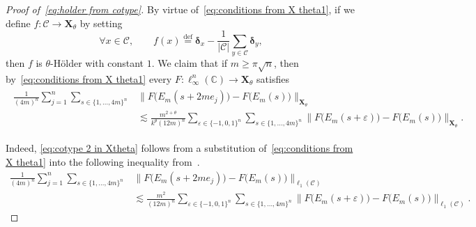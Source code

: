 \documentclass[11pt,reqno]{amsart}
\renewcommand{\ge}{\geqslant}
\renewcommand{\setminus}{\smallsetminus}
\newcommand{\bd}{\boldsymbol{\delta}}
\newcommand{\X}{\mathbf X}
\renewcommand{\bd}{\boldsymbol{\delta}}
\newcommand{\e}{\varepsilon}
\theoremstyle{remark}
\newcommand{\C}{\mathbb C}
\newcommand{\eqdef}{\stackrel{\mathrm{def}}{=}}
\newcommand{\sub}{\mathscr{C}}
\renewcommand{\1}{\mathbf 1}
\begin{document}
\begin{proof}[Proof of~\eqref{eq:holder from cotype}]
By virtue of~\eqref{eq:conditions from X theta1}, if we define $f:\sub \to \X_\theta$ by setting
$$
\forall x\in \sub,\qquad f(x)\eqdef \bd_x-\frac{1}{|\sub|}\sum_{y\in \sub}\bd_y,
$$ then $f$ is $\theta$-H\"older with constant $1$. We claim that if $m\ge \pi\sqrt{n}$, then by~\eqref{eq:conditions from X theta1} every $F:\ell_\infty^n(\C)\to \X_\theta$ satisfies
\begin{align}\label{eq:cotype 2 in Xtheta}
\begin{split}
\frac{1}{(4m)^n}\sum_{j=1}^n \sum_{s\in \{1,\ldots,4m\}^n} &\big\|F \big(E_m(s+2me_j)\big)-F\big(E_m(s)\big)\big\|_{\X_\theta}\\ &\lesssim \frac{m^{2+\theta}}{k^\theta (12m)^n}\sum_{\e\in \{-1,0,1\}^n} \sum_{s\in \{1,\ldots,4m\}^n}\big\|F\big(E_m(s+\e)\big)-F\big(E_m(s)\big)\big\|_{\X_\theta}.
\end{split}
\end{align}

Indeed, \eqref{eq:cotype 2 in Xtheta} follows from a substitution of~\eqref{eq:conditions from X theta1} into the following inequality from~\cite[Remark~7.5]{MN08}.
\begin{align*}
\frac{1}{(4m)^n}\sum_{j=1}^n \sum_{s\in \{1,\ldots,4m\}^n} &\big\|F \big(E_m(s+2me_j)\big)-F\big(E_m(s)\big)\big\|_{\ell_1(\sub)}\\ &\lesssim \frac{m^2}{(12m)^n}\sum_{\e\in \{-1,0,1\}^n} \sum_{s\in \{1,\ldots,4m\}^n} \big\|F\big(E_m(s+\e)\big)-F\big(E_m(s)\big)\big\|_{\ell_1(\sub)}.
\end{align*}




\end{proof}
\end{document}
